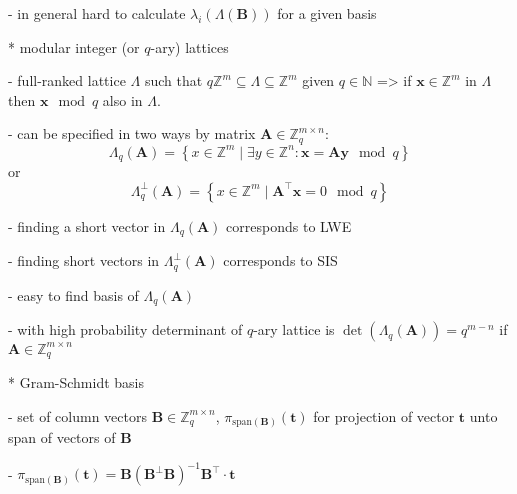 \documentclass[
  a4paper,  %
  twoside,  %
  bibliography=totoc,
  headsepline,
  cleardoublepage=empty,
  parskip=half,
  draft=false
]{scrbook}
\begin{document}
    - in general hard to calculate $\lambda_i(\Lambda(\mathbf{B}))$ for a given basis  
  
  * modular integer (or $q$-ary) lattices %

    - full-ranked lattice $\Lambda$ such that $q\mathbb{Z}^m \subseteq	\Lambda \subseteq	\mathbb{Z}^m$ given $q \in \mathbb{N}$ => if $\mathbf{x} \in \mathbb{Z}^m$ in $\Lambda$ then $\mathbf{x} \mod q$ also in $\Lambda$. 

    - can be specified in two ways by matrix $\mathbf{A} \in \mathbb{Z}_q^{m\times n}$: %
    \begin{equation}
      \Lambda_q(\mathbf{A}) = \left\{ x \in \mathbb{Z}^m \mid \exists y \in \mathbb{Z}^n : \mathbf{x} = \mathbf{A}\mathbf{y} \mod q \right\}
    \end{equation}
    or
    \begin{equation}
      \Lambda_q^\perp(\mathbf{A}) = \left\{ x \in \mathbb{Z}^m \mid  \mathbf{A}^\intercal\mathbf{x} = 0 \mod q \right\}
    \end{equation}

    - finding a short vector in $\Lambda_q(\mathbf{A})$ corresponds to LWE %

    - finding short vectors in $\Lambda_q^\perp(\mathbf{A})$ corresponds to SIS %

    - easy to find basis of $\Lambda_q(\mathbf{A})$ \cite{AFG13}

    - with high probability determinant of $q$-ary lattice is $\det(\Lambda_q(\mathbf{A}))=q^{m-n}$ if $\mathbf{A} \in \mathbb{Z}_q^{m\times n}$


  * Gram-Schmidt basis

    - set of column vectors $\mathbf{B} \in \mathbb{Z}_q^{m\times n}$, $\pi_{\text{span}(\mathbf{B})}(\mathbf{t})$ for projection of vector $\mathbf{t}$ unto span of vectors of $\mathbf{B}$

    - $\pi_{\text{span}(\mathbf{B})}(\mathbf{t}) = \mathbf{B}(\mathbf{B}^\perp \mathbf{B})^{-1}\mathbf{B}^\intercal \cdot \mathbf{t}$
\end{document}

